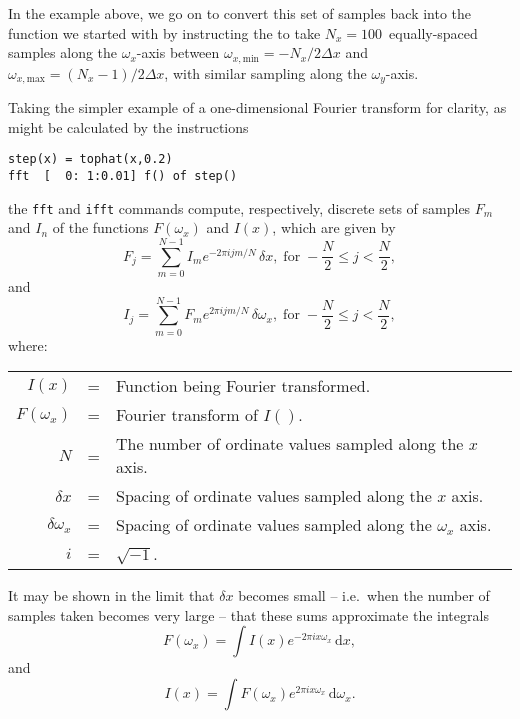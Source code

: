 In the example above, we go on to convert this set of samples back into the
function we started with by instructing the  to take
$N_x=100$~equally-spaced samples along the $\omega_x$-axis between
$\omega_{x,\mathrm{min}}=-{N_x}/{2\Delta x}$ and
$\omega_{x,\mathrm{max}}=(N_x-1)/{2\Delta x}$, with similar sampling along the
$\omega_y$-axis.

Taking the simpler example of a one-dimensional Fourier transform for clarity,
as might be calculated by the instructions
\begin{verbatim}
step(x) = tophat(x,0.2)
fft  [  0: 1:0.01] f() of step()
\end{verbatim}
the {\tt fft} and {\tt ifft} commands compute,
respectively, discrete sets of samples $F_m$ and $I_n$ of the functions
$F(\omega_x)$ and $I(x)$, which are given by
\begin{displaymath}
F_j = \sum_{m=0}^{N-1} I_m e^{-2\pi ijm/N} \,\delta x,\;\textrm{for}\; -\frac{N}{2}\leq j <\frac{N}{2} ,
\end{displaymath}
\noindent and
\begin{displaymath}
I_j = \sum_{m=0}^{N-1} F_m e^{ 2\pi ijm/N} \,\delta \omega_x,\;\textrm{for}\; -\frac{N}{2}\leq j <\frac{N}{2} ,
\end{displaymath}
\noindent where:
\begin{tabular}{rcp{9cm}}
$I(x)$        & = & Function being Fourier transformed. \\
$F(\omega_x)$ & = & Fourier transform of $I()$. \\
$N$           & = & The number of ordinate values sampled along the $x$ axis. \\
$\delta x$    & = & Spacing of ordinate values sampled along the $x$ axis. \\
$\delta \omega_x$ & = & Spacing of ordinate values sampled along the $\omega_x$ axis. \\
$i$           & = & $\sqrt{-1}$. \\
\end{tabular}
\vspace{2mm}

It may be shown in the limit that $\delta x$ becomes small -- i.e.\ when the
number of samples taken becomes very large -- that these sums approximate the
integrals
\begin{equation}
F(\omega_x) = \int I(x) e^{-2\pi ix\omega_x} \,\mathrm{d}x ,
\end{equation}
\noindent and
\begin{equation}
I(x) = \int F(\omega_x) e^{ 2\pi ix\omega_x} \,\mathrm{d}\omega_x .
\end{equation}

